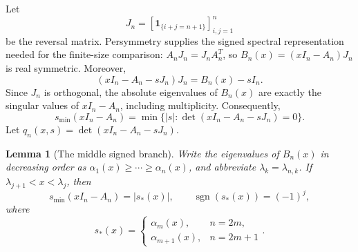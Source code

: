 \documentclass[a4paper,preprint,12pt,nopreprintline,sort&compress]{elsarticle}
\numberwithin{equation}{section}
\newtheorem{lemma}[theorem]{Lemma}
\theoremstyle{remark}
\begin{document}
Let
\[
 J_n=[\boldsymbol 1_{\{i+j=n+1\}}]_{i,j=1}^n
\]
be the reversal matrix.  Persymmetry supplies the signed spectral
representation needed for the finite-size comparison:
\(A_nJ_n=J_nA_n^T\), so
\(B_n(x)=(xI_n-A_n)J_n\) is real symmetric.  Moreover,
\[
 (xI_n-A_n-sJ_n)J_n=B_n(x)-sI_n.
\]
Since \(J_n\) is orthogonal, the absolute eigenvalues of \(B_n(x)\)
are exactly the singular values of \(xI_n-A_n\), including multiplicity.
Consequently,
\begin{equation}\label{eq:signed-pencil}
 s_{\min}(xI_n-A_n)
 =\min\{|s|:\det(xI_n-A_n-sJ_n)=0\}.
\end{equation}
Let \(q_n(x,s)=\det(xI_n-A_n-sJ_n)\).
\begin{lemma}[The middle signed branch]\label{lem:middle-branch}
Write the eigenvalues of \(B_n(x)\) in decreasing order as
\(\alpha_1(x)\geq\cdots\geq\alpha_n(x)\), and abbreviate
\(\lambda_k=\lambda_{n,k}\).
If \(\lambda_{j+1}<x<\lambda_j\), then
\[
 s_{\min}(xI_n-A_n)=|s_*(x)|,
 \qquad \operatorname{sgn}(s_*(x))=(-1)^j,
\]
where
\[
 s_*(x)=
 \begin{cases}
  \alpha_m(x),&n=2m,\\
  \alpha_{m+1}(x),&n=2m+1
 \end{cases}.
\]
\end{lemma}
\end{document}
